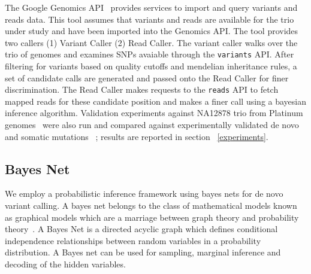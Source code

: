 \documentclass{article}
\begin{document}
The Google Genomics API~\cite{GoogleGenomics} provides services to import and query variants and reads data. This tool assumes that variants and reads are available for the trio under study and have been imported into the Genomics API. The tool provides two callers (1) Variant Caller (2) Read Caller. The variant caller walks over the trio of genomes and examines SNPs avaiable through the \verb|variants| API. After filtering for variants based on quality cutoffs and mendelian inheritance rules, a set of candidate calls are generated and passed onto the Read Caller for finer discrimination. The Read Caller makes requests to the \verb|reads| API to fetch mapped reads for these candidate position and makes a finer call using a bayesian inference algorithm.  Validation experiments against NA12878 trio from Platinum genomes~\cite{platinum} were also run and compared against experimentally validated de novo and somatic mutations~\cite{Conrad2011} ; results are reported in section ~\ref{experiments}.

\subsection{Bayes Net}
We employ a probabilistic inference framework using bayes nets for de novo variant calling. A bayes net belongs to the class of mathematical models known as graphical models which are a marriage between graph theory and probability theory~\cite{Jordan2008}. A Bayes Net is a directed acyclic graph which defines conditional independence relationships between random variables in a probability distribution. A Bayes net can be used for sampling, marginal inference and decoding of the hidden variables.
\end{document}
